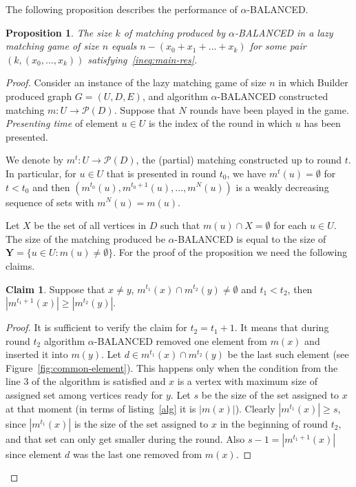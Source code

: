 \documentclass[12pt]{amsart}
\renewcommand{\geq}{\geqslant}
\newtheorem{prop}[theorem]{Proposition}
\theoremstyle{definition}
\newtheorem{claim}[theorem]{Claim}
\newcommand{\abs}[1]{\left\vert#1\right\vert}
\newcommand{\Alg}[0]{\textsf{BALANCED}\xspace}
\newcommand{\Br}{Builder\xspace}
\begin{document}
The following proposition describes the performance of $\alpha$-\Alg{}. 
\begin{prop}\label{prop:balanced_bound}
 The size $k$ of matching produced by $\alpha$-\Alg{} in a lazy matching game of size $n$ equals  $n-(x_0+x_1+\ldots+x_k)$
 for some pair $(k,(x_0,\ldots,x_k))$ satisfying~\eqref{ineq:main-res}.
\end{prop}
\begin{proof}
Consider an instance of the lazy matching game of size $n$ in which \Br produced graph $G=(U,D,E)$, and algorithm $\alpha$-\Alg{} constructed matching $m:U\to\mathcal{P}(D)$. 
Suppose that $N$ rounds have been played in the game.
\emph{Presenting time} of element $u\in U$ is the index of the round in which $u$ has been presented. 

We denote by $m^t:U\to\mathcal{P}(D)$, the (partial) matching constructed up to round $t$. 
In particular, for $u \in U$ that is presented in round $t_0$, we have $m^t(u)=\emptyset$ for $t< t_0$ and then $(m^{t_0}(u), m^{t_0+1}(u), \ldots,m^{N}(u))$ is a weakly decreasing sequence of sets with $m^{N}(u)=m(u)$. 

Let $X$ be the set of all vertices in $D$ such that $m(u)\cap X = \emptyset$ for each $u\in U$. 
The size of the matching produced be $\alpha$-\Alg{} is equal to the size of $\mathbf Y = \{u \in U : m(u)\neq \emptyset\}$.
For the proof of the proposition we need the following claims. 
\begin{claim}
\label{claim:d1}
  Suppose that  $x\neq y$, $m^{t_1}(x) \cap m^{t_2}(y)\neq\emptyset$ and $t_1 < t_2$, then $\abs{m^{t_1+1}(x)} \geq\abs{m^{t_2}(y)}$. 
\end{claim}
\begin{proof}
It is sufficient to verify the claim for $t_2=t_1+1$. 
It means that 
during round $t_2$ algorithm $\alpha$-\Alg{} removed one element from $m(x)$ and inserted it into $m(y)$. 
Let $d\in m^{t_1}(x)\cap m^{t_2}(y)$ be the last such element (see Figure~\ref{fig:common-element}).
This happens only when the condition from the line 3 of the algorithm  is satisfied and  $x$ is a vertex with maximum size of assigned set among vertices ready for $y$. 
Let $s$ be the size of the set assigned to $x$ at that moment  (in terms of listing~\ref{alg} it is $\abs{m(x)}$). 
Clearly $\abs{m^{t_1}(x)} \geq s$, since $\abs{m^{t_1}(x)}$ is the size of the set assigned to $x$ in the beginning of round $t_2$, and that set can only get smaller during the round. 
Also $s-1=\abs{m^{t_1+1}(x)}$ since element $d$ was the last one removed from $m(x)$.


\end{proof}
\end{proof}
\end{document}
